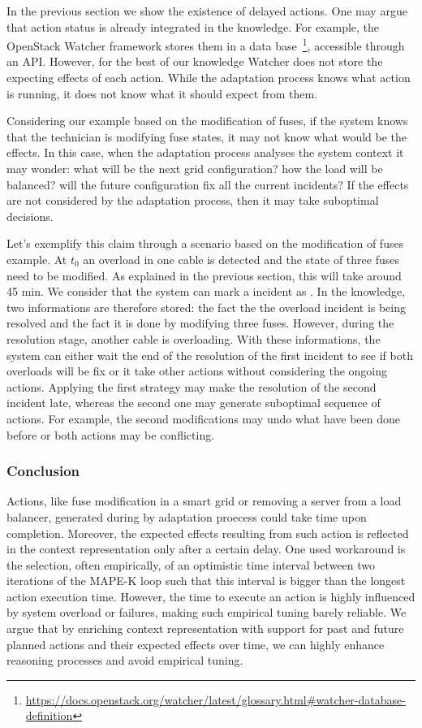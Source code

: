 In the previous section we show the existence of delayed actions.
One may argue that action status is already integrated in the knowledge.
For example, the OpenStack Watcher framework stores them in a data base~\footnote{\url{https://docs.openstack.org/watcher/latest/glossary.html\#watcher-database-definition}}, accessible through an API.
However, for the best of our knowledge Watcher does not store the expecting effects of each action.
While the adaptation process knows what action is running, it does not know what it should expect from them.

Considering our example based on the modification of fuses, if the system knows that the technician is modifying fuse states, it may not know what would be the effects.
In this case, when the adaptation process analyses the system context it may wonder: what will be the next grid configuration? how the load will be balanced? will the future configuration fix all the current incidents?
If the effects are not considered by the adaptation process, then it may take suboptimal decisions.

Let's exemplify this claim through a scenario based on the modification of fuses example.
At $t_{0}$ an overload in one cable is detected and the state of three fuses need to be modified.
As explained in the previous section, this will take around 45 min.
We consider that the system can mark a incident as .
In the knowledge, two informations are therefore stored: the fact the the overload incident is being resolved and the fact it is done by modifying three fuses.
However, during the resolution stage, another cable is overloading.
With these informations, the system can either wait the end of the resolution of the first incident to see if both overloads will be fix or it take other actions without considering the ongoing actions.
Applying the first strategy may make the resolution of the second incident late, whereas the second one may generate suboptimal sequence of actions.
For example, the second modifications may undo what have been done before or both actions may be conflicting.

\subsubsection{Conclusion}
\label{sec:tkm:intro:motivation:dact:conslusion}

Actions, like fuse modification in a smart grid or removing a server from a load balancer, generated during by adaptation proecess could take time upon completion. 
Moreover, the expected effects resulting from such action is reflected in the context representation only after a certain delay. 
One used workaround is the selection, often empirically, of an optimistic time interval between two iterations of the MAPE-K loop such that this interval is bigger than the longest action execution time.
However, the time to execute an action is highly influenced by system overload or failures, making such empirical tuning barely reliable.
We argue that by enriching context representation with support for past and future planned actions and their expected effects over time, we can highly enhance reasoning processes and avoid empirical tuning.

